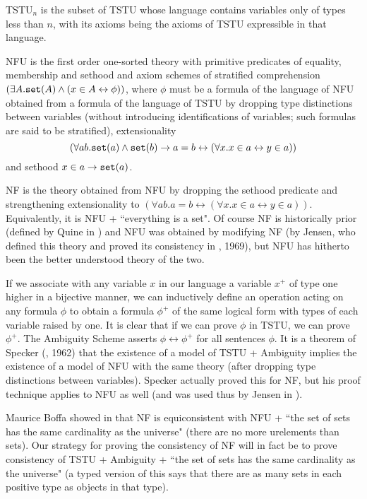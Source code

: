 \documentclass{article}
\begin{document}
TSTU$_n$ is the subset of TSTU whose language contains variables only of types less than $n$, with its axioms being the axioms of TSTU expressible in that language.

NFU is the first order one-sorted theory with primitive predicates of equality, membership and sethood and axiom schemes of stratified comprehension $(\exists A.{\tt set}(A) \wedge (x \in A \leftrightarrow \phi))$, where $\phi$ must be a formula of the language of NFU obtained from a formula of the language of TSTU by dropping type distinctions between variables (without introducing identifications of variables; such formulas are said to be stratified), extensionality
$$(\forall ab.{\tt set}(a) \wedge {\tt set}(b) \rightarrow a=b \leftrightarrow (\forall x.x \in a \leftrightarrow y \in a))$$ and sethood $x \in a \rightarrow {\tt set}(a)$.

NF is the theory obtained from NFU by dropping the sethood predicate and strengthening extensionality to $(\forall ab.a=b \leftrightarrow (\forall x.x \in a \leftrightarrow y \in a))$.   Equivalently, it is NFU + ``everything is a set".   Of course NF is historically prior (defined by Quine in \cite{nf}) and NFU was obtained by modifying NF (by Jensen, who defined this theory and proved its consistency in \cite{nfu}, 1969), but NFU has hitherto been the better understood theory of the two.

If we associate with any variable $x$ in our language a variable $x^+$ of type one higher in a bijective manner, we can inductively define an operation acting on any formula $\phi$ to obtain a formula
$\phi^+$ of the same logical form with types of each variable raised by one.   It is clear that if we can prove $\phi$ in TSTU, we can prove $\phi^+$.   The Ambiguity Scheme asserts
$\phi \leftrightarrow \phi^+$ for all sentences $\phi$.   It is a theorem of Specker (\cite{specker}, 1962) that the existence of a model of TSTU + Ambiguity implies the existence of a model of NFU
with the same theory (after dropping type distinctions between variables).  Specker actually proved this for NF,  but his proof technique applies to NFU as well (and was used thus by Jensen in \cite{nfu}).

Maurice Boffa showed in \cite{boffaperms} that NF is equiconsistent with NFU + ``the set of sets has the same cardinality as the universe"  (there are no more urelements than sets).  Our strategy for proving the consistency of NF will in fact be to prove consistency of TSTU + Ambiguity + ``the set of sets has the same cardinality as the universe" (a typed version of this says that there are as many sets in each positive type as objects in that type).
\end{document}
